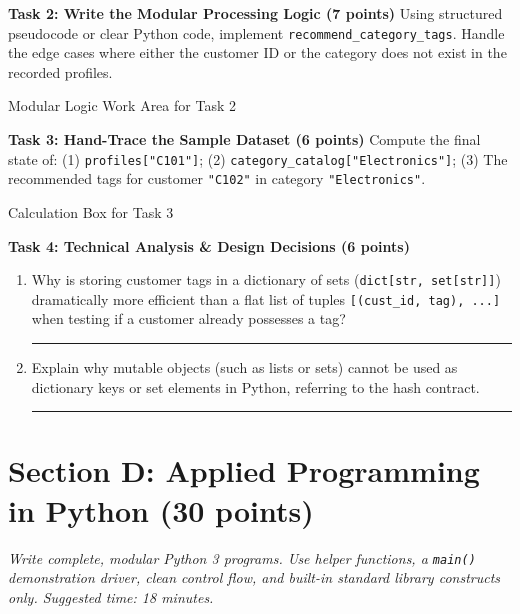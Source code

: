 \documentclass[11pt,a4paper]{article}
\begin{document}
\textbf{Task 2: Write the Modular Processing Logic (7 points)}
Using structured pseudocode or clear Python code, implement \texttt{recommend\_category\_tags}. Handle the edge cases where either the customer ID or the category does not exist in the recorded profiles.
\begin{answerbox}[height=3.8cm]{Modular Logic Work Area for Task 2}\end{answerbox}
\textbf{Task 3: Hand-Trace the Sample Dataset (6 points)}
Compute the final state of: (1) \texttt{profiles["C101"]}; (2) \texttt{category\_catalog["Electronics"]}; (3) The recommended tags for customer \texttt{"C102"} in category \texttt{"Electronics"}.
\begin{answerbox}[height=2.8cm]{Calculation Box for Task 3}\end{answerbox}
\textbf{Task 4: Technical Analysis \& Design Decisions (6 points)}
\begin{enumerate}[label=\alph*),leftmargin=1.8em,itemsep=2pt]
\item Why is storing customer tags in a dictionary of sets (\texttt{dict[str, set[str]]}) dramatically more efficient than a flat list of tuples \texttt{[(cust\_id, tag), ...]} when testing if a customer already possesses a tag?\\[-1pt]\rule{\linewidth}{0.4pt}
\item Explain why mutable objects (such as lists or sets) cannot be used as dictionary keys or set elements in Python, referring to the hash contract.\\[-1pt]\rule{\linewidth}{0.4pt}
\end{enumerate}
\newpage
\section*{Section D: Applied Programming in Python \hfill \normalsize\normalfont(30 points)}
\textit{Write complete, modular Python 3 programs. Use helper functions, a \texttt{main()} demonstration driver, clean control flow, and built-in standard library constructs only. Suggested time: 18 minutes.}
\end{document}
